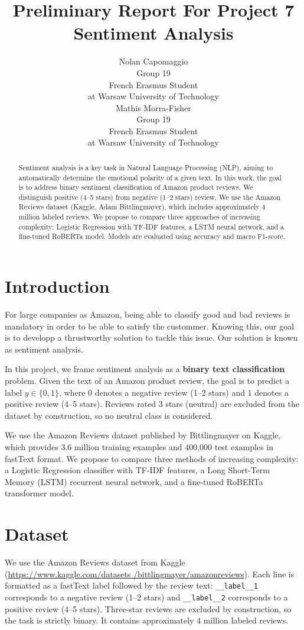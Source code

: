 \documentclass{article}
\title{Preliminary Report For Project 7\\Sentiment Analysis}
\author{
  Nolan Capomaggio \\
  Group 19 \\
  French Erasmus Student\\at Warsaw University of Technology \\
  \And
  Mathis Morra-Fisher \\
  Group 19 \\
  French Erasmus Student\\at Warsaw University of Technology \\
  \AND
}
\begin{document}
\maketitle

\begin{abstract}
  Sentiment analysis is a key task in Natural Language Processing (NLP), 
  aiming to automatically determine the emotional polarity of a given text. 
  In this work, the goal is to address binary sentiment classification of Amazon 
  product reviews. We distinguish positive (4–5 stars) from negative (1–2 stars) 
  review. We use the Amazon Reviews dataset (Kaggle, Adam Bittlingmayer), 
  which includes approximately 4 million labeled reviews. We propose to compare 
  three approaches of increasing complexity: Logistic Regression with TF-IDF 
  features, a LSTM neural network, and a fine-tuned RoBERTa 
  model. Models are evaluated using accuracy and macro F1-score.
\end{abstract}


\section{Introduction}
For large companies as Amazon, being able to classify good and bad reviews is 
mandatory in order to be able to satisfy the custommer. Knowing this, our 
goal is to developp a thrustworthy solution to tackle this issue. Our solution 
is known as sentiment analysis.

In this project, we frame sentiment analysis as a \textbf{binary text classification}
problem.
Given the text of an Amazon product review, the goal is to predict a label
$y \in \{0, 1\}$, where $0$ denotes a negative review (1–2 stars) and $1$ denotes
a positive review (4–5 stars).
Reviews rated 3 stars (neutral) are excluded from the dataset by construction,
so no neutral class is considered.

We use the Amazon Reviews dataset published by Bittlingmayer on Kaggle,
which provides 3.6 million training examples and 400,000 test examples in fastText
format.
We propose to compare three methods of increasing complexity: a Logistic Regression
classifier with TF-IDF features, a Long Short-Term Memory (LSTM) recurrent neural
network, and a fine-tuned RoBERTa transformer model.


\section{Dataset}
We use the Amazon Reviews dataset from Kaggle (\url{https://www.kaggle.com/datasets
/bittlingmayer/amazonreviews}). 
Each line is formatted as a fastText label followed by the review text:
\texttt{\_\_label\_\_1} corresponds to a negative review (1--2 stars) and
\texttt{\_\_label\_\_2} corresponds to a positive review (4--5 stars).
Three-star reviews are excluded by construction, so the task is strictly binary.
It contains approximately 4 million labeled reviews.
\end{document}
